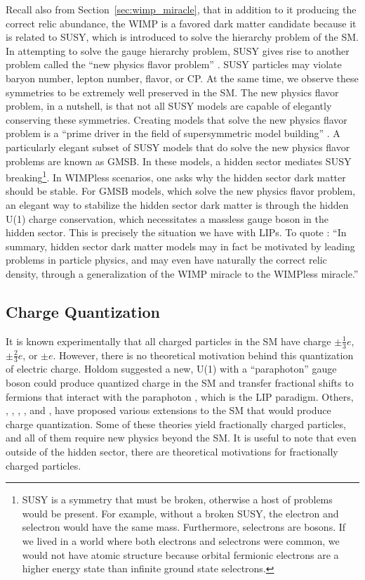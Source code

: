 Recall also from Section~\ref{sec:wimp_miracle}, that in addition to it producing the correct relic abundance, the \ac{WIMP} is a favored dark matter candidate because it is related to \ac{SUSY}, which is introduced to solve the hierarchy problem of the \ac{SM}. In attempting to solve the gauge hierarchy problem, \ac{SUSY} gives rise to another problem called the ``new physics flavor problem'' \cite{Feng2010}. \ac{SUSY} particles may violate baryon number, lepton number, flavor, or CP. At the same time, we observe these symmetries to be extremely well preserved in the \ac{SM}. The new physics flavor problem, in a nutshell, is that not all \ac{SUSY} models are capable of elegantly conserving these symmetries. Creating models that solve the new physics flavor problem is a ``prime driver in the field of supersymmetric model building'' \cite{Feng2010}.  A particularly elegant subset of \ac{SUSY} models that do solve the new physics flavor problems are known as \ac{GMSB}. In these models, a hidden sector mediates \ac{SUSY} breaking\footnote{\ac{SUSY} is a symmetry that must be broken, otherwise a host of problems would be present. For example, without a broken \ac{SUSY}, the electron and selectron would have the same mass. Furthermore, selectrons are bosons. If we lived in a world where both electrons and selectrons were common, we would not have atomic structure because orbital fermionic electrons are a higher energy state than infinite ground state selectrons.}. In \ac{WIMP}less scenarios, one asks why the hidden sector dark matter should be stable. For \ac{GMSB} models, which solve the new physics flavor problem, an elegant way to stabilize the hidden sector dark matter is through the hidden U(1) charge conservation, which necessitates a massless gauge boson in the hidden sector. This is precisely the situation we have with \ac{LIP}s. To quote \cite{Feng2010}: ``In summary, hidden sector dark matter models may in fact be motivated by leading problems in particle physics, and may even have naturally the correct relic density, through a generalization of the \ac{WIMP} miracle to the \ac{WIMP}less miracle.''

\subsection{Charge Quantization}
It is known experimentally that all charged particles in the \ac{SM} have charge $\pm\frac{1}{3}e$, $\pm\frac{2}{3}e$, or $\pm e$. However, there is no theoretical motivation behind this quantization of electric charge. Holdom suggested a new, U(1) with a ``paraphoton'' gauge boson could produce quantized charge in the \ac{SM} and transfer fractional shifts to fermions that interact with the paraphoton \cite{Holdom1986}, which is the \ac{LIP} paradigm. Others, \cite{Foot1993}, \cite{Babu1990}, \cite{Schellekens1990}, \cite{Wen1985}, and \cite{Dirac1931}, have proposed various extensions to the \ac{SM} that would produce charge quantization. Some of these theories yield fractionally charged particles, and all of them require new physics beyond the \ac{SM}. It is useful to note that even outside of the hidden sector, there are theoretical motivations for fractionally charged particles. 


